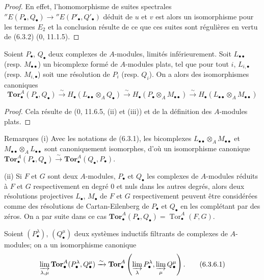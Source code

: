 \begin{proof}
En effet, l'homomorphisme de suites spectrales
$''E(P_\bullet,Q_\bullet)\to''E(P'_\bullet,Q'_\bullet)$ déduit de $u$ et $v$
est alors un isomorphisme pour les termes $E_2$ et la conclusion résulte de
ce que ces suites sont régulières en vertu de (6.3.2) (0, 11.1.5).
\end{proof}

\begin{proposition}[6.3.4]
Soient $P_\bullet$, $Q_\bullet$ deux complexes de $A$-modules, limités
inférieurement. Soit $L_{\bullet\bullet}$ (resp. $M_{\bullet\bullet}$) un
bicomplexe formé de $A$-modules plats, tel que pour tout $i$,
$L_{i,\bullet}$ (resp. $M_{i,\bullet}$) soit une résolution de $P_i$
(resp. $Q_i$). On a alors des isomorphismes canoniques
\[
  \mathbf{Tor}_\bullet^A(P_\bullet,Q_\bullet)
  \xrightarrow{\sim}H_\bullet(L_{\bullet\bullet}\otimes_AQ_\bullet)
  \xrightarrow{\sim}H_\bullet(P_\bullet\otimes_AM_{\bullet\bullet})
  \xrightarrow{\sim}H_\bullet(L_{\bullet\bullet}\otimes_AM_{\bullet\bullet})
  \tag{6.3.4.1}\label{III.6.3.4.1.fr}
\]
\end{proposition}

\begin{proof}
Cela résulte de (0, 11.6.5, (ii) et (iii)) et de la définition des
$A$-modules plats.
\end{proof}

\begin{namedtheorem}[6.3.5]{Remarques}
(i) Avec les notations de (6.3.1), les bicomplexes
$L_{\bullet\bullet}\otimes_A M_{\bullet\bullet}$ et
$M_{\bullet\bullet}\otimes_A L_{\bullet\bullet}$ sont canoniquement
isomorphes, d'où un isomorphisme canonique
$\mathbf{Tor}_\bullet^A(P_\bullet,Q_\bullet)\xrightarrow{\sim}
\mathbf{Tor}_\bullet^A(Q_\bullet,P_\bullet)$.

(ii) Si $F$ et $G$ sont deux $A$-modules, $P_\bullet$ et $Q_\bullet$ les
complexes de $A$-modules réduits à $F$ et $G$ respectivement en degré 0 et
nuls dans les autres degrés, alors deux résolutions projectives $L_\bullet$,
$M_\bullet$ de $F$ et $G$ respectivement peuvent être considérées comme des
résolutions de Cartan-Eilenberg de $P_\bullet$ et $Q_\bullet$ en les
complétant par des zéros. On a par suite dans ce cas
$\mathbf{Tor}_\bullet^A(P_\bullet,Q_\bullet)
=\operatorname{Tor}_\bullet^A(F,G)$.
\end{namedtheorem}

\begin{proposition}[6.3.6]
Soient $(P_\bullet^\lambda)$, $(Q_\bullet^\mu)$ deux systèmes inductifs
filtrants de complexes de $A$-modules; on a un isomorphisme canonique
\[
  \varinjlim_{\lambda,\mu}
  \mathbf{Tor}_\bullet^A(P_\bullet^\lambda,Q_\bullet^\mu)
  \xrightarrow{\sim}
  \mathbf{Tor}_\bullet^A
  \left(\varinjlim_\lambda P_\bullet^\lambda,
        \varinjlim_\mu Q_\bullet^\mu\right).
  \tag{6.3.6.1}\label{III.6.3.6.1.fr}
\]
\end{proposition}

